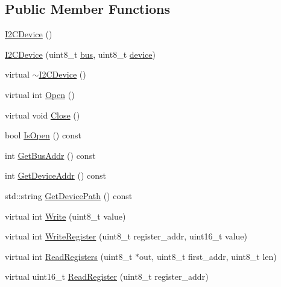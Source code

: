 \subsection*{Public Member Functions}
\begin{DoxyCompactItemize}
\item 
\hyperlink{classcubesat_1_1I2CDevice_afa6d28cbaab65cfc2ad60a63bc95d30d}{I2\+C\+Device} ()
\item 
\hyperlink{classcubesat_1_1I2CDevice_a9fad0233c906bdbbe9b66ceaacfbb35e}{I2\+C\+Device} (uint8\+\_\+t \hyperlink{classcubesat_1_1I2CDevice_acc13c6328bb7f29ddc5b9436d6b40816}{bus}, uint8\+\_\+t \hyperlink{classcubesat_1_1I2CDevice_a59cdefbd8b9720d194254c617f5c9b07}{device})
\item 
virtual \hyperlink{classcubesat_1_1I2CDevice_aebf54d150dca31a5bd8ddd524cb5bb00}{$\sim$\+I2\+C\+Device} ()
\item 
virtual int \hyperlink{classcubesat_1_1I2CDevice_a9a3ac852fdca8da83bcf5d771c710264}{Open} ()
\item 
virtual void \hyperlink{classcubesat_1_1I2CDevice_a09c6fe7b6318662e4438ee52c21cee20}{Close} ()
\item 
bool \hyperlink{classcubesat_1_1I2CDevice_abcc65de8ac56247998f20a0023351959}{Is\+Open} () const
\item 
int \hyperlink{classcubesat_1_1I2CDevice_aae688e4c62fafe205028fc0301492b40}{Get\+Bus\+Addr} () const
\item 
int \hyperlink{classcubesat_1_1I2CDevice_a9621077493039877b663245a0491c3fa}{Get\+Device\+Addr} () const
\item 
std\+::string \hyperlink{classcubesat_1_1I2CDevice_aa5919f5bdade4ad2d4ca5b54894350b7}{Get\+Device\+Path} () const
\item 
virtual int \hyperlink{classcubesat_1_1I2CDevice_a4c961bc762deb1388a541f148de32b7e}{Write} (uint8\+\_\+t value)
\item 
virtual int \hyperlink{classcubesat_1_1I2CDevice_ae80e31206a3b08754ca9649326c7e682}{Write\+Register} (uint8\+\_\+t register\+\_\+addr, uint16\+\_\+t value)
\item 
virtual int \hyperlink{classcubesat_1_1I2CDevice_ade46491355547ba50c00a078527dff93}{Read\+Registers} (uint8\+\_\+t $\ast$out, uint8\+\_\+t first\+\_\+addr, uint8\+\_\+t len)
\item 
virtual uint16\+\_\+t \hyperlink{classcubesat_1_1I2CDevice_a398afc2399a0c9164398ee8fdb759669}{Read\+Register} (uint8\+\_\+t register\+\_\+addr)
\end{DoxyCompactItemize}
